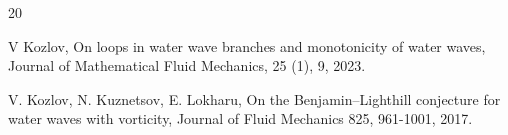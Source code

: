 \documentclass[a4paper,reqno,12pt]{amsart}
\theoremstyle{plain}
\theoremstyle{definition}
\numberwithin{equation}{section}
\begin{document}
{\begin{thebibliography}{20}









 V Kozlov, On loops in water wave branches and monotonicity of
water waves,
Journal of Mathematical Fluid Mechanics, 25 (1), 9, 2023.





 V. Kozlov, N. Kuznetsov, E. Lokharu, On the Benjamin–Lighthill
conjecture for water waves with vorticity,
Journal of Fluid Mechanics 825, 961-1001, 2017.





\end{thebibliography}}
\end{document}
